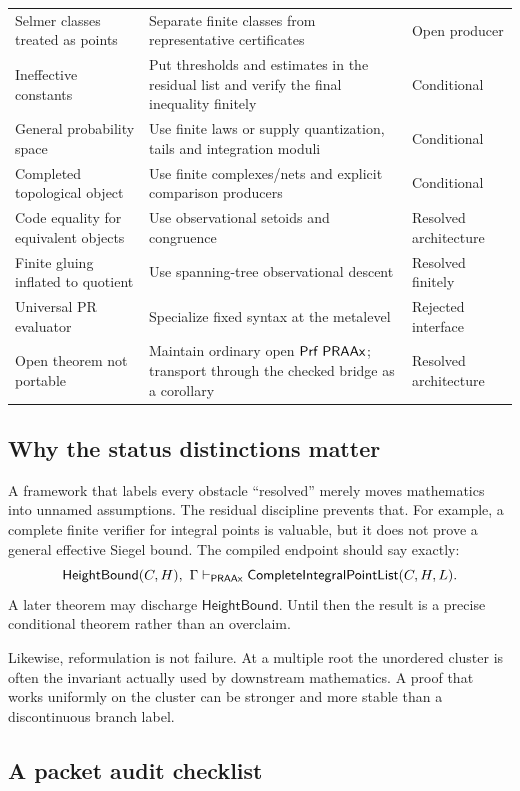 \begin{longtable}{@{}p{}p{}p{}@{}}
Selmer classes treated as points & Separate finite classes from representative
certificates & Open producer \\
Ineffective constants & Put thresholds and estimates in the residual list and
verify the final inequality finitely & Conditional \\
General probability space & Use finite laws or supply quantization, tails and
integration moduli & Conditional \\
Completed topological object & Use finite complexes/nets and explicit comparison
producers & Conditional \\
Code equality for equivalent objects & Use observational setoids and congruence & Resolved architecture \\
Finite gluing inflated to quotient & Use spanning-tree observational descent & Resolved finitely \\
Universal PR evaluator & Specialize fixed syntax at the metalevel & Rejected interface \\
Open theorem not portable & Maintain ordinary open \(\mathsf{Prf}\;\mathsf{PRAAx}\); transport
through the checked bridge as a corollary & Resolved architecture \\
\bottomrule
\end{longtable}
\normalsize

\subsection{Why the status distinctions matter}

A framework that labels every obstacle ``resolved'' merely moves mathematics
into unnamed assumptions.  The residual discipline prevents that.  For
example, a complete finite verifier for integral points is valuable, but it
does not prove a general effective Siegel bound.  The compiled endpoint should
say exactly:
\[
  \mathsf{HeightBound}(C,H),\ \Gamma
     \mathrel{\vdash_{\mathsf{PRAAx}}} \mathsf{CompleteIntegralPointList}(C,H,L).
\]
A later theorem may discharge \(\mathsf{HeightBound}\).  Until then the result
is a precise conditional theorem rather than an overclaim.

Likewise, reformulation is not failure.  At a multiple root the unordered
cluster is often the invariant actually used by downstream mathematics.  A
proof that works uniformly on the cluster can be stronger and more stable than
a discontinuous branch label.

\subsection{A packet audit checklist}


